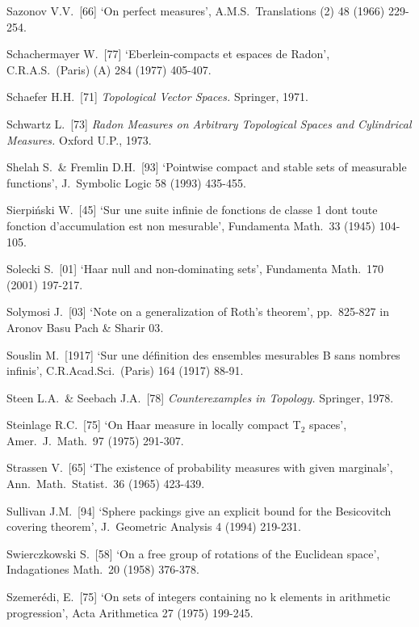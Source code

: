 {\medskip%

Sazonov V.V.\ [66] `On perfect measures', A.M.S.\ Translations (2) 48
(1966) 229-254.
\cmmnt{[451F.]}

Schachermayer W.\ [77] `Eberlein-compacts et espaces de Radon',
C.R.A.S.\ (Paris) (A) 284 (1977) 405-407.
\cmmnt{[467P.]}

Schaefer H.H.\ [71] {\it Topological Vector Spaces.}  Springer, 1971.
\cmmnt{[\S4A4.]}

Schwartz L.\ [73] {\it Radon Measures on Arbitrary Topological Spaces
and Cylindrical Measures.}   Oxford U.P., 1973.
\cmmnt{[\S434 {\it notes\/}.]}

Shelah S.\ \& Fremlin D.H.\ [93] `Pointwise compact and stable sets of
measurable functions', J.\ Symbolic Logic 58 (1993) 435-455.
\cmmnt{[\S465 {\it notes\/}.]}

Sierpi\'nski W.\ [45] `Sur une suite infinie de fonctions de classe 1 dont toute fonction d'accumulation est non mesurable', Fundamenta Math.\ 33 (1945) 104-105.
\cmmnt{[464C.]}

Solecki S.\ [01] `Haar null and non-dominating sets',
Fundamenta Math.\ 170 (2001) 197-217.
\cmmnt{[444Ye.]}

Solymosi J.\ [03]
`Note on a generalization of Roth's theorem', pp.\ 825-827 in
{\smc Aronov Basu Pach \& Sharir 03}.
\cmmnt{[497M.]}

Souslin M.\ [1917] `Sur une d\'efinition des ensembles mesurables B sans
nombres infinis', C.R.Acad.Sci.\ (Paris) 164 (1917) 88-91.
\cmmnt{[421D, \S421 {\it notes\/}.]}

Steen L.A.\ \& Seebach J.A.\ [78] {\it Counterexamples in Topology.}
Springer, 1978.
\cmmnt{[434Ya, \S439 {\it notes\/}.]}

Steinlage R.C.\ [75] `On Haar measure in locally compact T$_2$ spaces',
Amer.\ J.\ Math.\ 97 (1975) 291-307.
\cmmnt{[441C.]}

Strassen V.\ [65] `The existence of probability measures with given
marginals', Ann.\ Math.\ Statist.\ 36 (1965) 423-439.
\cmmnt{[457D.]}

Sullivan J.M.\ [94] `Sphere packings give an explicit bound for the
Besicovitch covering theorem', J.\ Geometric Analysis 4 (1994) 219-231.
\cmmnt{[\S472 {\it notes\/}.]}

Swierczkowski S.\ [58] `On a free group of rotations of the Euclidean space', Indagationes Math.\ 20 (1958) 376-378.
\cmmnt{[449Yi.]}

Szemer\'edi, E.\ [75]
`On sets of integers containing no k elements in arithmetic progression',
Acta Arithmetica 27 (1975) 199-245.
\cmmnt{[497L.]}

}

